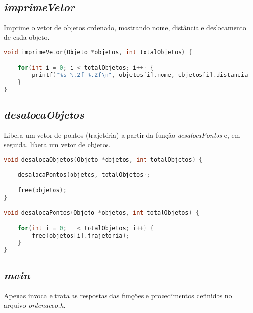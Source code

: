 \documentclass{article}
\begin{document}

\subsection{\textit{imprimeVetor}}

\hspace*{\parindent}Imprime o vetor de objetos ordenado, mostrando nome, distância e deslocamento de cada objeto.

\begin{lstlisting}[label={lst:cod1},language=C]
void imprimeVetor(Objeto *objetos, int totalObjetos) {

    for(int i = 0; i < totalObjetos; i++) {
        printf("%s %.2f %.2f\n", objetos[i].nome, objetos[i].distancia, objetos[i].deslocamento);
    }
}
\end{lstlisting}


\subsection{\textit{desalocaObjetos}}

\hspace*{\parindent}Libera um vetor de pontos (trajetória) a partir da função \textit{desalocaPontos} e, em seguida, libera um vetor de objetos.

\begin{lstlisting}[label={lst:cod1},language=C]
void desalocaObjetos(Objeto *objetos, int totalObjetos) {

    desalocaPontos(objetos, totalObjetos);

    free(objetos);
}

void desalocaPontos(Objeto *objetos, int totalObjetos) {   

    for(int i = 0; i < totalObjetos; i++) {
        free(objetos[i].trajetoria);
    }
}
\end{lstlisting}


\subsection{\textit{main}}

\hspace*{\parindent}Apenas invoca e trata as respostas das funções e procedimentos definidos no arquivo \textit{ordenacao.h}.
\end{document}
